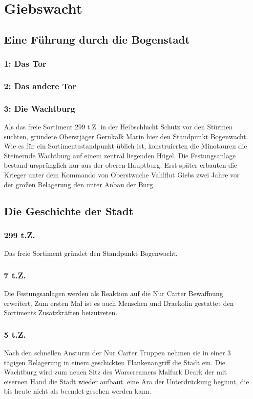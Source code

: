 \chapter{Giebswacht} \label{ch:giebswacht}

\section{Eine Führung durch die Bogenstadt}

\subsection*{1: Das Tor}
\subsection*{2: Das andere Tor}
\subsection*{3: Die Wachtburg}

Als das freie Sortiment 299 t.Z. in der Heibschlucht Schutz vor den Stürmen suchten, gründete Oberstjäger Gernkalk Marin hier den Standpunkt Bogenwacht. Wie es für ein Sortimentsstandpunkt üblich ist, konstruierten die Minotauren die Steinernde Wachtburg auf einem zentral liegenden Hügel. Die Festungsanlage bestand ursprünglich nur aus der oberen Hauptburg. Erst später erbauten die Krieger unter dem Kommando von Oberstwache Vahlflut Giebs zwei Jahre vor der großen Belagerung den unter Anbau der Burg.

\section{Die Geschichte der Stadt}

\subsection*{299 t.Z.}
Das freie Sortiment gründet den Standpunkt Bogenwacht.
\subsection*{7 t.Z.}
Die Festungsanlagen werden als Reaktion auf die Nur Carter Bewaffnung erweitert. Zum ersten Mal ist es auch Menschen und Draekolin gestattet den Sortiments Zusatzkräften beizutreten.\\
\subsection*{5 t.Z.}
Nach den schnellen Ansturm der Nur Carter Truppen nehmen sie in einer 3 tägigen Belagerung in einem geschickten Flankenangriff die Stadt ein. Die Wachtburg wird zum neuen Sitz des Warscreamers Malfurk Deark der mit eisernen Hand die Stadt wieder aufbaut. eine Ära der Unterdrückung beginnt, die bis heute nicht als beendet gesehen werden kann.\\